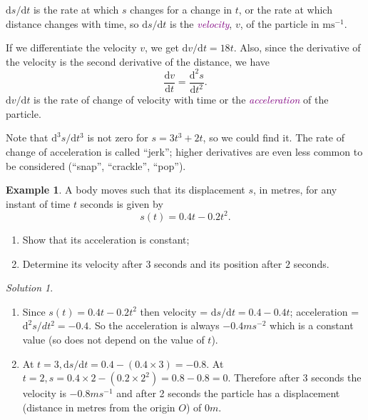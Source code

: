 \documentclass[
  english,
  11pt,
  oneside]{book}
\providecommand{\tightlist}{%
  \setlength{\itemsep}{0pt}\setlength{\parskip}{0pt}}
\newcommand{\slide}{}
\theoremstyle{definition}
\theoremstyle{definition}
\newtheorem{example}{Example}[chapter]
\theoremstyle{definition}
\theoremstyle{definition}
\theoremstyle{remark}
\newtheorem*{solution}{Solution}
\begin{document}
\slide

\(\mathrm{d} s/\mathrm{d} t\) is the rate at which \(s\) changes for a change in \(t\), or the rate at which distance changes with time, so \(\mathrm{d} s/\mathrm{d} t\) is the \textcolor{purple}{\em velocity}, \(v\), of the particle in \(\text{m}\text{s}^{-1}\).

If we differentiate the velocity \(v\), we get \(\mathrm{d} v/\mathrm{d} t = 18t\). Also, since the derivative of the velocity is the second derivative of the distance, we have
\[\frac{\mathrm{d} v}{\mathrm{d} t}= \frac{\mathrm{d}^{2}s}{\mathrm{d}t^2}.\]
\(\mathrm{d} v/\mathrm{d} t\) is the rate of change of velocity with time or the \textcolor{purple}{\em acceleration} of the particle.

Note that \(\mathrm{d}^{3}s/\mathrm{d} t^{3}\) is not zero for \(s = 3t^3 + 2t\), so we could find it. The rate of change of acceleration is called ``jerk''; higher derivatives are even less common to be considered (``snap'', ``crackle'', ``pop'').
\slide

\begin{example}

A body moves such that its displacement \(s\), in metres, for any instant of time \(t\) seconds is given by
\[s(t) = 0.4t-0.2t^2.\]

\begin{enumerate}
\def\labelenumi{\arabic{enumi}.}
\tightlist
\item
  Show that its acceleration is constant;
\item
  Determine its velocity after \(3\) seconds and its position after \(2\) seconds.
\end{enumerate}

\end{example}

\begin{solution}
\leavevmode

\begin{enumerate}
\def\labelenumi{\arabic{enumi}.}
\item
  Since \(s(t) = 0.4t-0.2t^2\) then velocity = \(\mathrm{d} s/\mathrm{d} t = 0.4-0.4t\); acceleration = \(\mathrm{d}^{2}s/dt^2 = -0.4\).
  So the acceleration is always \(-0.4ms^{-2}\) which is a constant value (so does not depend on the value of \(t\)).
\item
  At \(t=3, \mathrm{d} s/\mathrm{d} t = 0.4-(0.4\times 3) = -0.8\). At \(t=2, s = 0.4\times2-(0.2\times 2^2) = 0.8-0.8 = 0\). Therefore after \(3\) seconds the velocity is \(-0.8ms^{-1}\) and after 2 seconds the particle has a displacement (distance in metres from the origin \(O\)) of \(0m\).
\end{enumerate}

\end{solution}
\end{document}
